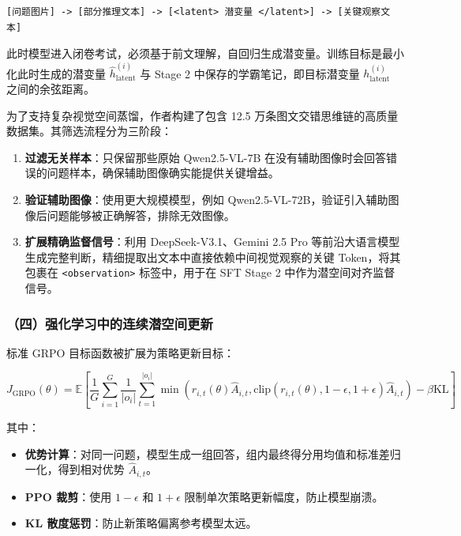 \begin{verbatim}
[问题图片] -> [部分推理文本] -> [<latent> 潜变量 </latent>] -> [关键观察文本]
\end{verbatim}

此时模型进入闭卷考试，必须基于前文理解，自回归生成潜变量。训练目标是最小化此时生成的潜变量 \(\hat h_{\text{latent}}^{(i)}\) 与 Stage 2 中保存的学霸笔记，即目标潜变量 \(h_{\text{latent}}^{(i)}\) 之间的余弦距离。

为了支持复杂视觉空间蒸馏，作者构建了包含 12.5 万条图文交错思维链的高质量数据集。其筛选流程分为三阶段：

\begin{enumerate}
\def\labelenumi{\arabic{enumi}.}
\tightlist
\item
  \textbf{过滤无关样本}：只保留那些原始 Qwen2.5-VL-7B 在没有辅助图像时会回答错误的问题样本，确保辅助图像确实能提供关键增益。
\item
  \textbf{验证辅助图像}：使用更大规模模型，例如 Qwen2.5-VL-72B，验证引入辅助图像后问题能够被正确解答，排除无效图像。
\item
  \textbf{扩展精确监督信号}：利用 DeepSeek-V3.1、Gemini 2.5 Pro 等前沿大语言模型生成完整判断，精细提取出文本中直接依赖中间视觉观察的关键 Token，将其包裹在 \texttt{\textless{}observation\textgreater{}} 标签中，用于在 SFT Stage 2 中作为潜空间对齐监督信号。
\end{enumerate}

\hypertarget{ux56dbux5f3aux5316ux5b66ux4e60ux4e2dux7684ux8fdeux7eedux6f5cux7a7aux95f4ux66f4ux65b0}{%
\subsubsection{（四）强化学习中的连续潜空间更新}\label{ux56dbux5f3aux5316ux5b66ux4e60ux4e2dux7684ux8fdeux7eedux6f5cux7a7aux95f4ux66f4ux65b0}}

标准 GRPO 目标函数被扩展为策略更新目标：

\[
J_{\text{GRPO}}(\theta) =
\mathbb{E}\left[
\frac{1}{G}\sum_{i=1}^{G}\frac{1}{|o_i|}
\sum_{t=1}^{|o_i|}
\min\left(
r_{i,t}(\theta)\hat A_{i,t},
\mathrm{clip}(r_{i,t}(\theta),1-\epsilon,1+\epsilon)\hat A_{i,t}
\right)
-\beta\mathrm{KL}
\right]
\]

其中：

\begin{itemize}
\tightlist
\item
  \textbf{优势计算}：对同一问题，模型生成一组回答，组内最终得分用均值和标准差归一化，得到相对优势 \(\hat A_{i,t}\)。
\item
  \textbf{PPO 裁剪}：使用 \(1-\epsilon\) 和 \(1+\epsilon\) 限制单次策略更新幅度，防止模型崩溃。
\item
  \textbf{KL 散度惩罚}：防止新策略偏离参考模型太远。
\end{itemize}

